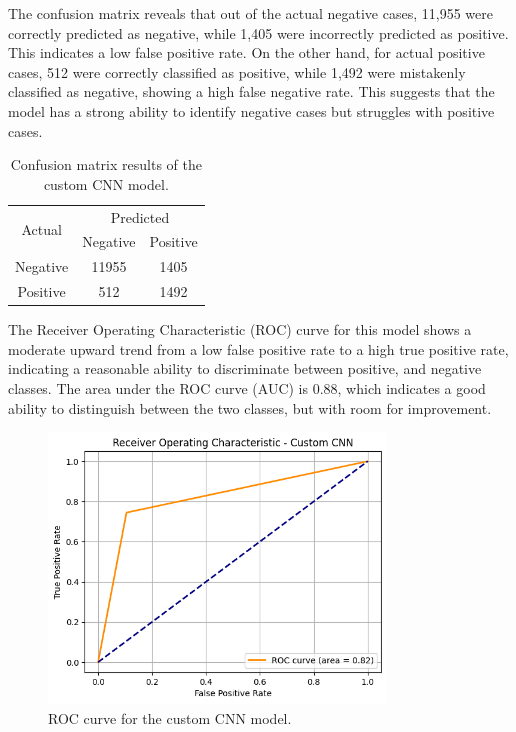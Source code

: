 \documentclass[../main]{subfiles}
\begin{document}
\noindent The confusion matrix reveals that out of the actual negative cases, 11,955 were correctly predicted as negative, while 1,405 were incorrectly predicted as positive. This indicates a low false positive rate. On the other hand, for actual positive cases, 512 were correctly classified as positive, while 1,492 were mistakenly classified as negative, showing a high false negative rate. This suggests that the model has a strong ability to identify negative cases but struggles with positive cases.

\begin{table}[h!]
    \centering
    \begin{tabular}{|c|c|c|}
        \hline
        \multirow{2}{*}{Actual} & \multicolumn{2}{c|}{Predicted} \\ \cline{2-3}
                                & Negative         & Positive         \\ \hline
        Negative                & 11955            & 1405              \\ \hline
        Positive                & 512              & 1492              \\ \hline
    \end{tabular}
    \caption{Confusion matrix results of the custom CNN model.}
    \label{tab:confusion-matrix-custom-cnn}
\end{table}

\noindent The Receiver Operating Characteristic (ROC) curve for this model shows a moderate upward trend from a low false positive rate to a high true positive rate, indicating a reasonable ability to discriminate between positive, and negative classes. The area under the ROC curve (AUC) is 0.88, which indicates a good ability to distinguish between the two classes, but with room for improvement.

\begin{figure}[h!]
	\centering
	\includegraphics[width=0.8\textwidth]{assets/roc_custom_cnn.png}
	\caption{ROC curve for the custom CNN model.}
    \label{fig:roc-custom-cnn}
\end{figure}
\end{document}

